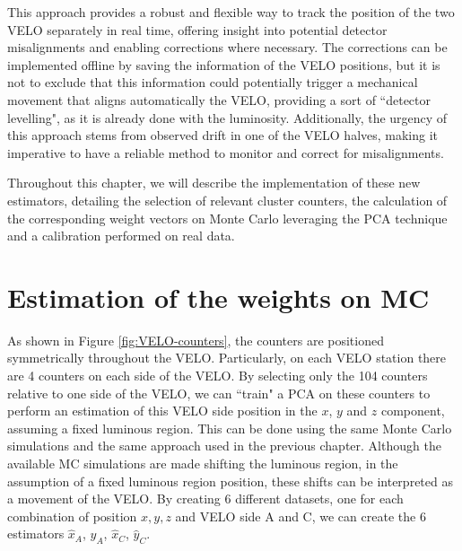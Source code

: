 This approach provides a robust and flexible way to track the position of the two VELO separately in real time, offering insight into potential detector misalignments and enabling corrections where necessary. The corrections can be implemented offline by saving the information of the VELO positions, but it is not to exclude that this information could potentially trigger a mechanical movement that aligns automatically the VELO, providing a sort of ``detector levelling", as it is already done with the luminosity. Additionally, the urgency of this approach stems from observed drift in one of the VELO halves, making it imperative to have a reliable method to monitor and correct for misalignments.

Throughout this chapter, we will describe the implementation of these new estimators, detailing the selection of relevant cluster counters, the calculation of the corresponding weight vectors on Monte Carlo leveraging the PCA technique and a calibration performed on real data.



\section{Estimation of the weights on MC}
As shown in Figure \ref{fig:VELO-counters}, the counters are positioned symmetrically throughout the VELO. Particularly, on each VELO station there are 4 counters on each side of the VELO. By selecting only the 104 counters relative to one side of the VELO, we can ``train" a PCA on these counters to perform an estimation of this VELO side position in the $x$, $y$ and $z$ component, assuming a fixed luminous region. This can be done using the same Monte Carlo simulations and the same approach used in the previous chapter. Although the available MC simulations are made shifting the luminous region, in the assumption of a fixed luminous region position, these shifts can be interpreted as a movement of the VELO. By creating 6 different datasets, one for each combination of position $x,y,z$ and VELO side A and C, we can create the 6 estimators $\hat{x}_A$, $\hat{y}_A$, $\hat{x}_C$, $\hat{y}_C$. 

